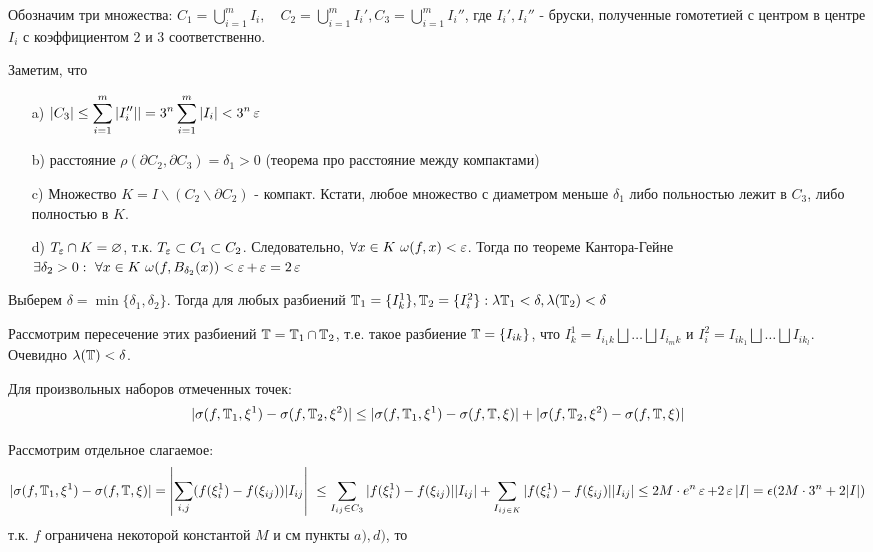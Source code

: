 \documentclass[a4paper, 10pt]{article}
\begin{document}
\begin{itemize}
    Обозначим три множества: $C_1 = \displaystyle\bigcup_{i=1}^mI_i, \quad C_2 = \displaystyle\bigcup_{i=1}^mI_i', C_3 = \displaystyle\bigcup_{i=1}^mI_i''$, где $I_i', I_i''$ - бруски, полученные гомотетией с центром в центре $I_i$ с коэффициентом 2 и 3 соответственно.

    Заметим, что
    \begin{itemize}
        \item[a)] $|C_3| \le \displaystyle\sum_{i=1}^m|I_i''|| = 3^n \displaystyle\sum_{i=1}^m|I_i| < 3^n \ve$
        \item[b)] расстояние $\rho(\partial C_2, \partial C_3) = \delta_1 > 0$ (теорема про расстояние между компактами)
        \item[c)] Множество $K = I\backslash(C_2\backslash \partial C_2)$ - компакт. Кстати, любое множество с диаметром меньше $\delta_1$ либо польностью лежит в $C_3$, либо полностью в $K$.
        \item[d)] $T_{\operatorname{\varepsilon}} \cap K = \varnothing$, т.к. $T_{\operatorname{\varepsilon}} \subset C_1 \subset C_2$. Следовательно, $\forall x\in K \,\, \omega(f, x) < \operatorname{\varepsilon}$. Тогда по теореме Кантора-Гейне $\exists \delta_2 > 0: \,\, \forall x\in K \,\, \omega(f, B_{\delta_2}(x)) < \operatorname{\varepsilon} + \operatorname{\varepsilon} = 2\operatorname{\varepsilon}$
    \end{itemize}

    Выберем $\delta = \min\{\delta_1, \delta_2\}$. Тогда для любых разбиений $\operatorname{\mathbb{T}}_1 = \{I_k^1\}, \operatorname{\mathbb{T}}_2 = \{I_i^2\}: \lambda{\operatorname{\mathbb{T}}_1} < \delta, \lambda(\operatorname{\mathbb{T}}_2) < \delta$

    Рассмотрим пересечение этих разбиений $\operatorname{\mathbb{T}} = \operatorname{\mathbb{T}}_1 \cap \operatorname{\mathbb{T}}_2$, т.е. такое разбиение $\operatorname{\mathbb{T}} = \{I_{ik}\}$, что $I_k^1 = I_{i_1k} \bigsqcup\ldots\bigsqcup I_{i_mk}$ и $I_i^2 = I_{ik_1} \bigsqcup \ldots\bigsqcup I_{ik_l}$. Очевидно $\lambda(\operatorname{\mathbb{T}}) < \delta$.

    Для произвольных наборов отмеченных точек:
    \begin{equation*}
        |\sigma(f, \operatorname{\mathbb{T}}_1, \xi^1) - \sigma(f, \operatorname{\mathbb{T}}_2, \xi^2)| \le |\sigma(f, \operatorname{\mathbb{T}}_1, \xi^1) - \sigma(f, \operatorname{\mathbb{T}}, \xi)| + |\sigma(f, \operatorname{\mathbb{T}}_2, \xi^2) - \sigma(f, \operatorname{\mathbb{T}}, \xi)|
    \end{equation*}

    Рассмотрим отдельное слагаемое:
    \begin{equation*}
        \begin{aligned}
            |\sigma(f, \T_1, \xi^1) - \sigma(f, \T, \xi)| = \left|\sum_{i, j}(f(\xi_i^1) - f(\xi_{ij}))|I_{ij}\right|\
            \le \sum_{I_{ij}\in C_3}|f(\xi_i^1) - f(\xi_{ij})||I_{ij}| + \sum_{I_{ij\in K}}|f(\xi_i^1)-f(\xi_{ij})||I_{ij}|\le 2M\cdot e^n\ve + 2\ve |I| = \epsilon(2M\cdot 3^n + 2|I|)
        \end{aligned}
    \end{equation*}
    т.к. $f$ ограничена некоторой константой $M$ и см пункты $a), d)$, то


\end{itemize}
\end{document}
